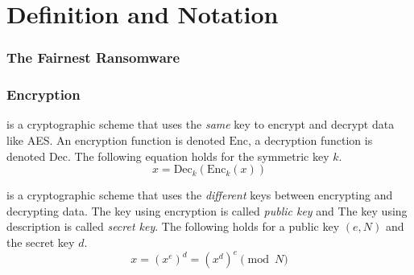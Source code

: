\section{Definition and Notation}

\begin{frame}
  \frametitle{The Fairnest Ransomware}


    \begin{center}
  \end{center} 
\end{frame}

\newcommand{\Enc}[2]{\text{Enc}_{#1}\left(#2\right)}
\newcommand{\Dec}[2]{\text{Dec}_{#1}\left(#2\right)}

\begin{frame}
  \frametitle{Encryption}

  \begin{description}
    \item<2->[Symmetric Key Encryption (SKE)]
    is a cryptographic scheme that uses the \emph{same} key to encrypt and
    decrypt data like AES.
    An encryption function is denoted $\text{Enc}$, a decryption function
    is denoted $\text{Dec}$. The following equation holds for the symmetric key $k$.
    \[
      x = \Dec{k}{\Enc{k}{x}}
    \]
    
    \item<3->[RSA Encryption]
    is a cryptographic scheme that uses the \emph{different} keys between encrypting and
    decrypting data. The key using encryption is called \emph{public key} and
    The key using description is called \emph{secret key}.
    The following holds for a public key $(e, N)$ and the secret key $d$.
    \[
      x = (x^e)^d = (x^d)^e \pmod{N}
    \]
  \end{description}
\end{frame}

